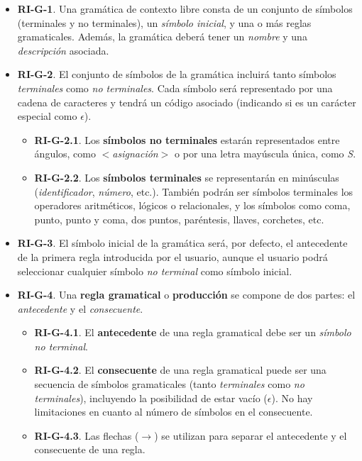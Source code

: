 \begin{itemize}
    \item \textbf{RI-G-1}. Una gramática de contexto libre consta de un conjunto de símbolos (terminales y no terminales), un \textit{símbolo inicial}, y una o más reglas gramaticales. Además, la gramática deberá tener un \textit{nombre} y una \textit{descripción} asociada.
    
    \item \textbf{RI-G-2}. El conjunto de símbolos de la gramática incluirá tanto símbolos \textit{terminales} como \textit{no terminales}. Cada símbolo será representado por una cadena de caracteres y tendrá un código asociado (indicando si es un carácter especial como $\epsilon$).
    \begin{itemize}
    \item \textbf{RI-G-2.1}. Los \textbf{símbolos no terminales} estarán representados entre ángulos, como \textit{$<$asignación$>$} o por una letra mayúscula única, como \textit{S}.
    \item \textbf{RI-G-2.2}. Los \textbf{símbolos terminales} se representarán en minúsculas (\textit{identificador}, \textit{número}, etc.). También podrán ser símbolos terminales  los operadores aritméticos, lógicos o relacionales, y los símbolos como coma, punto, punto y coma, dos puntos, paréntesis, llaves, corchetes, etc.
    \end{itemize}

    \item \textbf{RI-G-3}. El símbolo inicial de la gramática será, por defecto, el antecedente de la primera regla introducida por el usuario, aunque el usuario podrá seleccionar cualquier símbolo \textit{no terminal} como símbolo inicial.

    \item \textbf{RI-G-4}. Una \textbf{regla gramatical} o \textbf{producción} se compone de dos partes: el \textit{antecedente} y el \textit{consecuente}.
    \begin{itemize}
    \item \textbf{RI-G-4.1}. El \textbf{antecedente} de una regla gramatical debe ser un \textit{símbolo no terminal}.
    \item  \textbf{RI-G-4.2}. El \textbf{consecuente} de una regla gramatical puede ser una secuencia de símbolos gramaticales (tanto \textit{terminales} como \textit{no terminales}), incluyendo la posibilidad de estar vacío ($\epsilon$). No hay limitaciones en cuanto al número de símbolos en el consecuente.
   \item \textbf{RI-G-4.3}. Las flechas ($\rightarrow$) se utilizan para separar el antecedente y el consecuente de una regla.
    \end{itemize}


\end{itemize}
